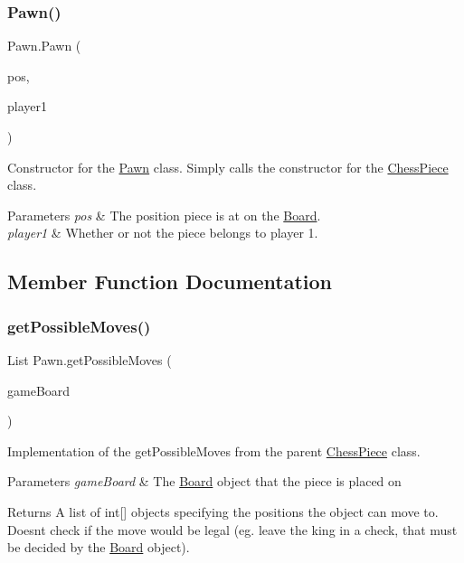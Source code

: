 \subsubsection{\texorpdfstring{Pawn()}{Pawn()}}
{\footnotesize\ttfamily Pawn.\+Pawn (\begin{DoxyParamCaption}\item[{@Not\+Null int \mbox{[}$\,$\mbox{]}}]{pos,  }\item[{boolean}]{player1 }\end{DoxyParamCaption})}

Constructor for the \mbox{\hyperlink{class_pawn}{Pawn}} class. Simply calls the constructor for the \mbox{\hyperlink{class_chess_piece}{Chess\+Piece}} class. 
\begin{DoxyParams}{Parameters}
{\em pos} & The position piece is at on the \mbox{\hyperlink{class_board}{Board}}. \\
\hline
{\em player1} & Whether or not the piece belongs to player 1. \\
\hline
\end{DoxyParams}


\subsection{Member Function Documentation}
\mbox{\label{class_pawn_a83c91f2521124c72ba6052425d19a878}} 
\subsubsection{\texorpdfstring{get\+Possible\+Moves()}{getPossibleMoves()}}
{\footnotesize\ttfamily List Pawn.\+get\+Possible\+Moves (\begin{DoxyParamCaption}\item[{@Not\+Null \mbox{\hyperlink{class_board}{Board}}}]{game\+Board }\end{DoxyParamCaption})}

Implementation of the get\+Possible\+Moves from the parent \mbox{\hyperlink{class_chess_piece}{Chess\+Piece}} class. 
\begin{DoxyParams}{Parameters}
{\em game\+Board} & The \mbox{\hyperlink{class_board}{Board}} object that the piece is placed on \\
\hline
\end{DoxyParams}
\begin{DoxyReturn}{Returns}
A list of int\mbox{[}\mbox{]} objects specifying the positions the object can move to. Doesn\textquotesingle{}t check if the move would be legal (eg. leave the king in a check, that must be decided by the \mbox{\hyperlink{class_board}{Board}} object). 
\end{DoxyReturn}
\mbox{\label{class_pawn_a5f995ad7b8d5d7ad4916ef0515b3649c}} 
